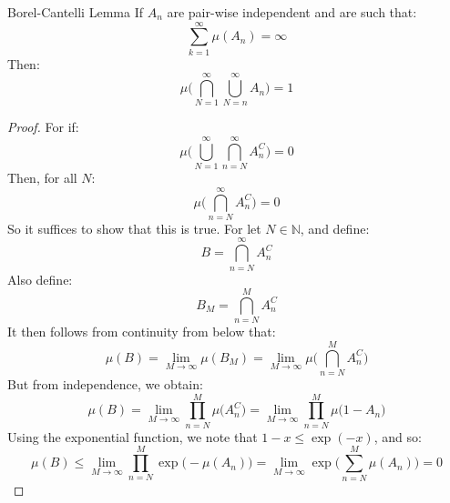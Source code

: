             \begin{ltheorem}{Borel-Cantelli Lemma}
                If $A_{n}$ are pair-wise independent and are such
                that:
                \begin{equation}
                    \sum_{k=1}^{\infty}\mu(A_{n})=\infty
                \end{equation}
                Then:
                \begin{equation}
                    \mu\Big(\bigcap_{N=1}^{\infty}
                        \bigcup_{N=n}^{\infty}A_{n}\Big)=1
                \end{equation}
            \end{ltheorem}
            \begin{proof}
                For if:
                \begin{equation}
                    \mu\Big(\bigcup_{N=1}^{\infty}\bigcap_{n=N}^{\infty}
                        A_{n}^{C}\big)=0
                \end{equation}
                Then, for all $N$:
                \begin{equation}
                    \mu\Big(\bigcap_{n=N}^{\infty}A_{n}^{C}\Big)=0
                \end{equation}
                So it suffices to show that this is true. For let
                $N\in\mathbb{N}$, and define:
                \begin{equation}
                    B=\bigcap_{n=N}^{\infty}A_{n}^{C}
                \end{equation}
                Also define:
                \begin{equation}
                    B_{M}=\bigcap_{n=N}^{M}A_{n}^{C}
                \end{equation}
                It then follows from continuity from below that:
                \begin{equation}
                    \mu(B)=\underset{M\rightarrow\infty}{\lim}\mu(B_{M})
                    =\underset{M\rightarrow\infty}{\lim}
                        \mu\Big(\bigcap_{n=N}^{M}A_{n}^{C}\Big)
                \end{equation}
                But from independence, we obtain:
                \begin{equation}
                    \mu(B)=\underset{M\rightarrow\infty}{\lim}
                        \prod_{n=N}^{M}\mu\big(A_{n}^{C}\big)
                    =\underset{M\rightarrow\infty}{\lim}
                        \prod_{n=N}^{M}\mu\big(1-A_{n}\big)
                \end{equation}
                Using the exponential function, we note that
                $1-x\leq\exp(\minus{x})$, and so:
                \begin{equation}
                    \mu(B)\leq               
                    \underset{M\rightarrow\infty}{\lim}
                        \prod_{n=N}^{M}\exp\big(\minus\mu(A_{n})\big)
                    =\underset{M\rightarrow\infty}{\lim}
                        \exp\Big(\sum_{n=N}^{M}\mu(A_{n})\Big)=0
                \end{equation}
            \end{proof}
